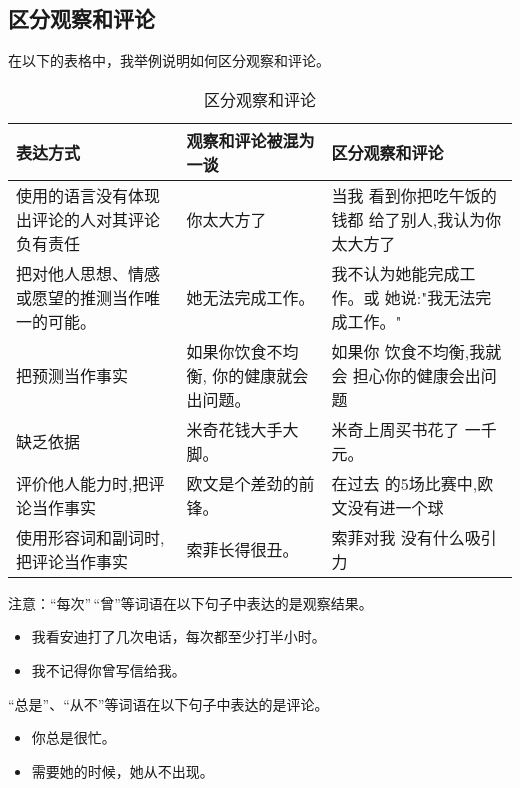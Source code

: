 \documentclass{ctexart}
\begin{document}
\subsection{区分观察和评论}

在以下的表格中，我举例说明如何区分观察和评论。

\begin{table}[H]
	\centering
	\begin{longtable}[]{@{}p{4cm}p{4cm}p{4cm}@{}} \toprule()表达方式
		                        & 观察和评论被混为一谈           & 区分观察和评论  \\
		\midrule()
		\endhead
		使用的语言没有体现 出评论的人对其评论负有责任 & 你太大方了                & 当我
		看到你把吃午饭的钱都 给了别人,我认为你太大方了
		\\
		把对他人思想、情感或愿望的推测当作唯一的可能。 & 她无法完成工作。             &
		我不认为她能完成工作。或 她说:"我无法完成工作。"
		\\
		把预测当作事实                 & 如果你饮食不均衡, 你的健康就会出问题。 & 如果你
		饮食不均衡,我就会 担心你的健康会出问题                                      \\
		缺乏依据                    & 米奇花钱大手大脚。            & 米奇上周买书花了
		一千元。                                                      \\
		评价他人能力时,把评论当作事实         & 欧文是个差劲的前锋。           & 在过去
		的5场比赛中,欧文没有进一个球                                           \\
		使用形容词和副词时, 把评论当作事实      & 索菲长得很丑。              & 索菲对我
		没有什么吸引力                                                   \\
		\bottomrule()
	\end{longtable}
	\caption{区分观察和评论}
	\label{tab:区分观察和评论}
\end{table}


注意：``每次''\,``曾''等词语在以下句子中表达的是观察结果。


\begin{itemize}
	\item 我看安迪打了几次电话，每次都至少打半小时。
	\item 我不记得你曾写信给我。
\end{itemize}

``总是''、``从不''等词语在以下句子中表达的是评论。

\begin{itemize}
	\item 你总是很忙。
	\item 需要她的时候，她从不出现。
\end{itemize}
\end{document}
